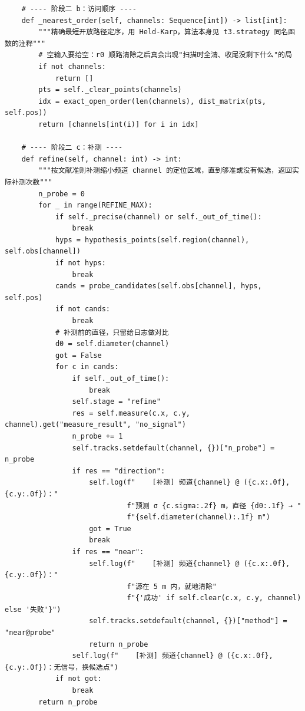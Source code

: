 \documentclass[UTF8, zihao=5,AutoFakeBold=2]{ctexart}
\begin{document}
\begin{lstlisting}
    # ---- 阶段二 b：访问顺序 ----
    def _nearest_order(self, channels: Sequence[int]) -> list[int]:
        """精确最短开放路径定序，用 Held-Karp，算法本身见 t3.strategy 同名函数的注释"""
        # 空输入要给空：r0 顺路清除之后真会出现"扫描时全清、收尾没剩下什么"的局
        if not channels:
            return []
        pts = self._clear_points(channels)
        idx = exact_open_order(len(channels), dist_matrix(pts, self.pos))
        return [channels[int(i)] for i in idx]

    # ---- 阶段二 c：补测 ----
    def refine(self, channel: int) -> int:
        """按文献准则补测缩小频道 channel 的定位区域，直到够准或没有候选，返回实际补测次数"""
        n_probe = 0
        for _ in range(REFINE_MAX):
            if self._precise(channel) or self._out_of_time():
                break
            hyps = hypothesis_points(self.region(channel), self.obs[channel])
            if not hyps:
                break
            cands = probe_candidates(self.obs[channel], hyps, self.pos)
            if not cands:
                break
            # 补测前的直径，只留给日志做对比
            d0 = self.diameter(channel)
            got = False
            for c in cands:
                if self._out_of_time():
                    break
                self.stage = "refine"
                res = self.measure(c.x, c.y, channel).get("measure_result", "no_signal")
                n_probe += 1
                self.tracks.setdefault(channel, {})["n_probe"] = n_probe
                if res == "direction":
                    self.log(f"    [补测] 频道{channel} @ ({c.x:.0f}, {c.y:.0f})："
                             f"预测 σ {c.sigma:.2f} m，直径 {d0:.1f} → "
                             f"{self.diameter(channel):.1f} m")
                    got = True
                    break
                if res == "near":
                    self.log(f"    [补测] 频道{channel} @ ({c.x:.0f}, {c.y:.0f})："
                             f"源在 5 m 内，就地清除"
                             f"{'成功' if self.clear(c.x, c.y, channel) else '失败'}")
                    self.tracks.setdefault(channel, {})["method"] = "near@probe"
                    return n_probe
                self.log(f"    [补测] 频道{channel} @ ({c.x:.0f}, {c.y:.0f})：无信号，换候选点")
            if not got:
                break
        return n_probe


\end{lstlisting}
\end{document}
